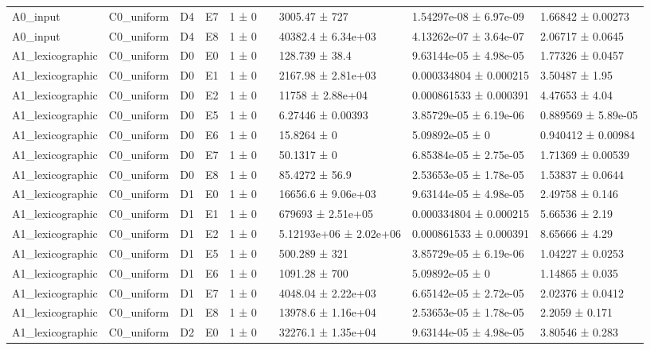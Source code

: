 \begin{table}
\begin{tabular}{lllllllll}
A0\_input & C0\_uniform & D4 & E7 & 1 ± 0 &  & 3005.47 ± 727 & 1.54297e-08 ± 6.97e-09 & 1.66842 ± 0.00273 \\
A0\_input & C0\_uniform & D4 & E8 & 1 ± 0 &  & 40382.4 ± 6.34e+03 & 4.13262e-07 ± 3.64e-07 & 2.06717 ± 0.0645 \\
A1\_lexicographic & C0\_uniform & D0 & E0 & 1 ± 0 &  & 128.739 ± 38.4 & 9.63144e-05 ± 4.98e-05 & 1.77326 ± 0.0457 \\
A1\_lexicographic & C0\_uniform & D0 & E1 & 1 ± 0 &  & 2167.98 ± 2.81e+03 & 0.000334804 ± 0.000215 & 3.50487 ± 1.95 \\
A1\_lexicographic & C0\_uniform & D0 & E2 & 1 ± 0 &  & 11758 ± 2.88e+04 & 0.000861533 ± 0.000391 & 4.47653 ± 4.04 \\
A1\_lexicographic & C0\_uniform & D0 & E5 & 1 ± 0 &  & 6.27446 ± 0.00393 & 3.85729e-05 ± 6.19e-06 & 0.889569 ± 5.89e-05 \\
A1\_lexicographic & C0\_uniform & D0 & E6 & 1 ± 0 &  & 15.8264 ± 0 & 5.09892e-05 ± 0 & 0.940412 ± 0.00984 \\
A1\_lexicographic & C0\_uniform & D0 & E7 & 1 ± 0 &  & 50.1317 ± 0 & 6.85384e-05 ± 2.75e-05 & 1.71369 ± 0.00539 \\
A1\_lexicographic & C0\_uniform & D0 & E8 & 1 ± 0 &  & 85.4272 ± 56.9 & 2.53653e-05 ± 1.78e-05 & 1.53837 ± 0.0644 \\
A1\_lexicographic & C0\_uniform & D1 & E0 & 1 ± 0 &  & 16656.6 ± 9.06e+03 & 9.63144e-05 ± 4.98e-05 & 2.49758 ± 0.146 \\
A1\_lexicographic & C0\_uniform & D1 & E1 & 1 ± 0 &  & 679693 ± 2.51e+05 & 0.000334804 ± 0.000215 & 5.66536 ± 2.19 \\
A1\_lexicographic & C0\_uniform & D1 & E2 & 1 ± 0 &  & 5.12193e+06 ± 2.02e+06 & 0.000861533 ± 0.000391 & 8.65666 ± 4.29 \\
A1\_lexicographic & C0\_uniform & D1 & E5 & 1 ± 0 &  & 500.289 ± 321 & 3.85729e-05 ± 6.19e-06 & 1.04227 ± 0.0253 \\
A1\_lexicographic & C0\_uniform & D1 & E6 & 1 ± 0 &  & 1091.28 ± 700 & 5.09892e-05 ± 0 & 1.14865 ± 0.035 \\
A1\_lexicographic & C0\_uniform & D1 & E7 & 1 ± 0 &  & 4048.04 ± 2.22e+03 & 6.65142e-05 ± 2.72e-05 & 2.02376 ± 0.0412 \\
A1\_lexicographic & C0\_uniform & D1 & E8 & 1 ± 0 &  & 13978.6 ± 1.16e+04 & 2.53653e-05 ± 1.78e-05 & 2.2059 ± 0.171 \\
A1\_lexicographic & C0\_uniform & D2 & E0 & 1 ± 0 &  & 32276.1 ± 1.35e+04 & 9.63144e-05 ± 4.98e-05 & 3.80546 ± 0.283 \\

\end{tabular}
\end{table}
